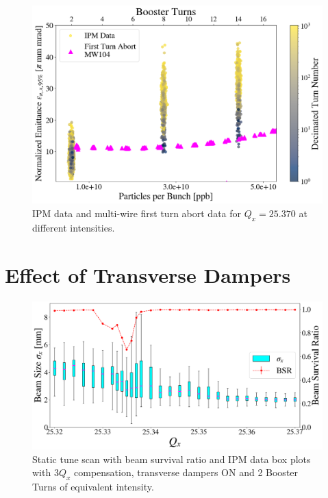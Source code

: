 \begin{figure}[H]
    \centering
    \includegraphics[width=\columnwidth]{chapter6/25370_scatter.png}
    \caption{IPM data and multi-wire first turn abort data for $Q_x=25.370$ at different intensities.}
    \label{fig:25370_scatter}
\end{figure}


\section{Effect of Transverse Dampers}

\begin{figure}[H]
    \centering
    \includegraphics[width=\columnwidth]{chapter6/static2turns_ipm_dampersON.png}
    \caption{Static tune scan with beam survival ratio and IPM data box plots with $3Q_x$ compensation, transverse dampers ON and 2 Booster Turns of equivalent intensity.}
    \label{fig:static2_dampersON}
\end{figure}

